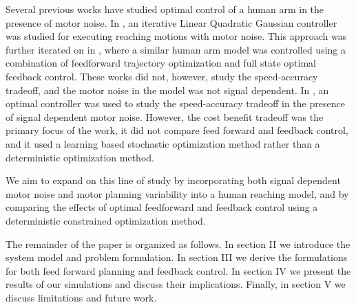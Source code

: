 \documentclass[letterpaper, 10pt, conference]{ieeeconf}
\begin{document}
Several previous works have studied optimal control of a human arm in the presence of motor noise. In \cite{ilqg}, an iterative Linear Quadratic Gaussian controller was studied for executing reaching motions with motor noise.
This approach was further iterated on in \cite{stochastic_model}, where a similar human arm model was controlled using a combination of feedforward trajectory optimization and full state optimal feedback control. These works did not, however, study the speed-accuracy tradeoff, and the motor noise in the model was not signal dependent. In \cite{cost_benefit_tradeoff}, an optimal controller was used to study the speed-accuracy tradeoff in the presence of signal dependent motor noise. However, the cost benefit tradeoff was the primary focus of the work, it did not compare feed forward and feedback control, and it used a learning based stochastic optimization method rather than a deterministic optimization method.

We aim to expand on this line of study by incorporating both signal dependent motor noise and motor planning variability into a human reaching model, and by comparing the effects of optimal feedforward and feedback control using a deterministic constrained optimization method.

The remainder of the paper is organized as follows. In section II we introduce the system model and problem formulation. In section III we derive the formulations for both feed forward planning and feedback control. In section IV we present the results of our simulations and discuss their implications. Finally, in section V we discuss limitations and future work.



\end{document}
